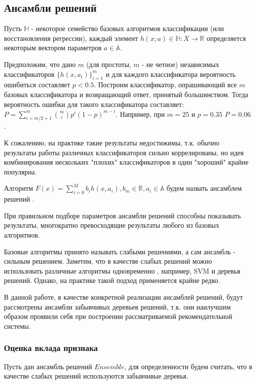 \documentclass[12pt,a4paper]{report}
\begin{document}
\subsection{Ансамбли решений}
Пусть $\mathbb{H}$ - некоторое семейство базовых алгоритмов классификации (или восстановления регрессии), каждый элемент $h(x; a) \in \mathbb{H} : X \to \mathbb{R}$ определяется некоторым вектором параметров $a \in \mathbb{A}$.

Предположим, что дано $m$ (для простоты, $m$ - не четное) независимых классификаторов $\{h(x, a_i)\}_{i=1}^m$ и для каждого классификатора вероятность ошибиться составляет $p < 0.5$.	Построим классификатор, опрашивающий все $m$ базовых классификатора и возвращающий ответ, принятый большинством. Тогда вероятность ошибки для такого классификатора составляет: $P = \sum_{i = m/2 + 1}^m \binom{m}{i}p^{i}(1-p)^{m-i}$. Например, при $m=25$ и $p=0.35$ $P=0.06$.

К сожалению, на практике такие результаты недостижимы, т.к. обычно результаты работы различных классификаторов сильно коррелированы, но идея комбинирования нескольких "плохих" классификаторов в один "хороший" крайне популярна.

\begin{Def}
Алгоритм $F(x) = \sum_{i=0}^{M}b_ih(x,a_i), b_m \in \mathbb{R}, a_i \in \mathbb{A}$ будем назвать ансамблем решений \cite{En}.
\end{Def}
При правильном подборе параметров ансамбли решений способны показывать результаты, многократно превосходящие результаты любого из базовых алгоритмов.


Базовые алгоритмы принято называть $\textit{слабыми решениями}$, а сам ансамбль - $\textit{сильным решением}$.
Заметим, что в качестве слабых решений можно использовать различные алгоритмы одновременно , например, SVM и деревья решений. Однако, на практике такой подход применяется крайне редко.

В данной работе, в качестве конкретной реализации ансамблей решений, будут рассмотрены ансамбли забывчивых деревьев решений, т.к. они наилучшим образом проявили себя при построении рассматриваемой рекомендательной системы.

\subsubsection{Оценка вклада признака}
Пусть дан ансамбль решений $Ensemble$, для определенности будем считать, что в качестве слабых решений используются забывчивые деревья.
\end{document}
